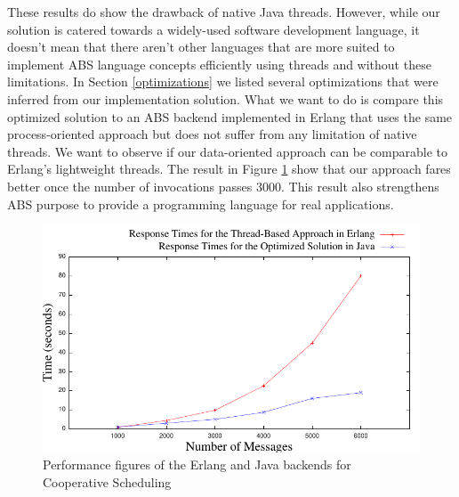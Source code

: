 \par These results do show the drawback of native Java threads. However, while our solution is catered towards a widely-used software development language, it doesn't mean that there aren't other languages that are more suited to implement ABS language concepts efficiently using threads and without these limitations. In Section \ref{optimizations} we listed several optimizations that were inferred from our implementation solution. What we want to do is compare this optimized solution to an ABS backend implemented in Erlang that uses the same process-oriented approach but does not suffer from any limitation of native threads. We want to observe if our data-oriented approach can be comparable to Erlang's lightweight threads. The result in Figure \ref{ej} show that our approach fares better once the number of invocations passes 3000. This result also strengthens ABS purpose to provide a programming language for real applications.

\begin{figure}
	\centering
	\includegraphics[scale=.9]{erlj8.pdf}
	\caption{Performance figures of the Erlang and Java backends for Cooperative Scheduling}
	\label{ej}
\end{figure}



